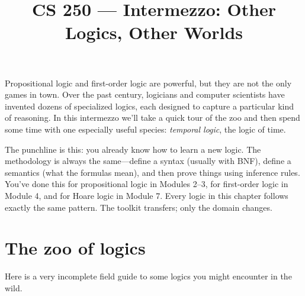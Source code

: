 \documentclass[11pt]{article}
\title{CS 250 --- Intermezzo: Other Logics, Other Worlds}
\author{}
\date{}
\begin{document}
\maketitle

Propositional logic and first-order logic are powerful, but they are not the only games in town. Over the past century, logicians and computer scientists have invented dozens of specialized logics, each designed to capture a particular kind of reasoning. In this intermezzo we'll take a quick tour of the zoo and then spend some time with one especially useful species: \emph{temporal logic}, the logic of time.

The punchline is this: you already know how to learn a new logic. The methodology is always the same---define a syntax (usually with BNF), define a semantics (what the formulas mean), and then prove things using inference rules. You've done this for propositional logic in Modules 2--3, for first-order logic in Module 4, and for Hoare logic in Module 7. Every logic in this chapter follows exactly the same pattern. The toolkit transfers; only the domain changes.

\section{The zoo of logics}

Here is a very incomplete field guide to some logics you might encounter in the wild.
\end{document}
